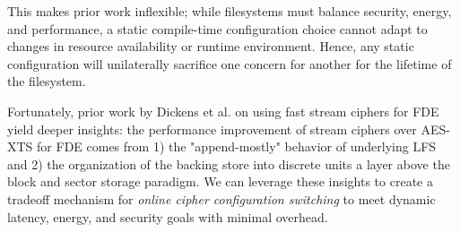 This makes prior work inflexible; while filesystems must balance security,
energy, and performance, a static compile-time configuration choice cannot adapt
to changes in resource availability or runtime environment. Hence, any static
configuration will unilaterally sacrifice one concern for another for the
lifetime of the filesystem.

Fortunately, prior work by Dickens et al. on using fast stream ciphers for FDE
yield deeper insights: the performance improvement of stream ciphers over
AES-XTS for FDE comes from 1) the "append-mostly" behavior of underlying LFS and
2) the organization of the backing store into discrete units a layer above the
block and sector storage paradigm. We can leverage these insights to create a
tradeoff mechanism for \emph{online cipher configuration switching} to meet
dynamic latency, energy, and security goals with minimal overhead.



